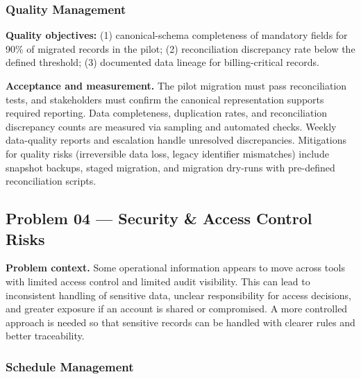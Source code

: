 \documentclass[12pt,a4paper]{report}
\begin{document}
\subsubsection{Quality Management}
\begin{summaryBox}
\textbf{Quality objectives:} (1) canonical-schema completeness of mandatory fields for 90\% of migrated records in the pilot; (2) reconciliation discrepancy rate below the defined threshold; (3) documented data lineage for billing-critical records.
\end{summaryBox}

\textbf{Acceptance and measurement.} The pilot migration must pass reconciliation tests, and stakeholders must confirm the canonical representation supports required reporting. Data completeness, duplication rates, and reconciliation discrepancy counts are measured via sampling and automated checks. Weekly data-quality reports and escalation handle unresolved discrepancies. Mitigations for quality risks (irreversible data loss, legacy identifier mismatches) include snapshot backups, staged migration, and migration dry-runs with pre-defined reconciliation scripts.

\subsection{Problem 04 --- Security \& Access Control Risks}

\textbf{Problem context.} Some operational information appears to move across tools with limited access control and limited audit visibility. This can lead to inconsistent handling of sensitive data, unclear responsibility for access decisions, and greater exposure if an account is shared or compromised. A more controlled approach is needed so that sensitive records can be handled with clearer rules and better traceability.

\subsubsection{Schedule Management}
\end{document}
